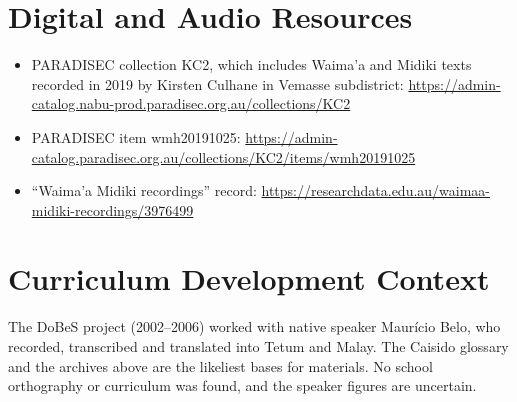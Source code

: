 \documentclass[12pt]{article}
\begin{document}
\section{Digital and Audio Resources}
\begin{itemize}
\item PARADISEC collection KC2, which includes Waima'a and Midiki texts recorded in 2019 by Kirsten Culhane in Vemasse subdistrict: \url{https://admin-catalog.nabu-prod.paradisec.org.au/collections/KC2}
\item PARADISEC item wmh20191025: \url{https://admin-catalog.paradisec.org.au/collections/KC2/items/wmh20191025}
\item ``Waima'a Midiki recordings'' record: \url{https://researchdata.edu.au/waimaa-midiki-recordings/3976499}
\end{itemize}

\section{Curriculum Development Context}
The DoBeS project (2002--2006) worked with native speaker Maur\'icio Belo, who recorded, transcribed and translated into Tetum and Malay. The Caisido glossary and the archives above are the likeliest bases for materials. No school orthography or curriculum was found, and the speaker figures are uncertain.
\end{document}
